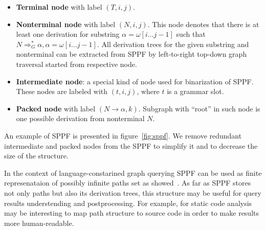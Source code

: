 \begin{itemize}
    \item \textbf{Terminal node} with label $(T, i, j)$.
    \item \textbf{Nonterminal node} with label $(N, i, j)$. 
    This node denotes that there is at least one derivation for substring $\alpha=\omega[i \dots j-1]$ such that $N \Rightarrow^*_G \alpha, \alpha = \omega[i \dots j-1] $.
    All derivation trees for the given substring and nonterminal can be extracted from SPPF by left-to-right top-down graph traversal started from respective node.     
    \item \textbf{Intermediate node}: a special kind of node used for binarization of SPPF. These nodes are labeled with $(t,i,j)$, where $t$ is a grammar slot.
    \item \textbf{Packed node} with label $(N \rightarrow \alpha, k)$. 
    Subgraph with ``root'' in such node is one possible derivation from nonterminal $N$.

\end{itemize}

An example of SPPF is presented in figure~\ref{fig:sppf}. 
We remove redundant intermediate and packed nodes from the SPPF to simplify it and to decrease the size of the structure.

In the context of language-constarined graph querying SPPF can be used as finite represenataion of possibly infinite paths set as showed~\cite{Grigorev16}.
As far as SPPF stores not only paths but also its derivation trees, this structure may be useful 
for query results understending and postprocessing.
For example, for static code analysis may be interesting to map path structure to source code in 
order to make results more human-readable.
